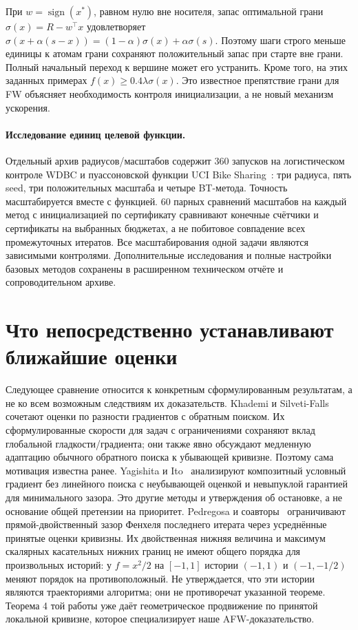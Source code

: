 При $w=\operatorname{sign}(x^*)$, равном нулю вне носителя,
запас оптимальной грани $\sigma(x)=R-w^\top x$ удовлетворяет
$\sigma(x+\alpha(s-x))=(1-\alpha)\sigma(x)+\alpha\sigma(s)$.
Поэтому шаги строго меньше единицы к атомам грани сохраняют
положительный запас при старте вне грани. Полный начальный переход
к вершине может его устранить. Кроме того, на этих заданных
примерах $f(x)\ge0.4\lambda\sigma(x)$.
Это известное препятствие грани для FW объясняет необходимость
контроля инициализации, а не новый механизм ускорения.

\paragraph{Исследование единиц целевой функции.}
Отдельный архив радиусов/масштабов содержит 360 запусков на
логистическом контроле WDBC и пуассоновской функции UCI Bike
Sharing~\cite{wdbc,bike}: три радиуса, пять seed, три положительных
масштаба и четыре BT-метода. Точность масштабируется вместе с функцией.
60 парных сравнений масштабов на каждый метод с инициализацией по
сертификату сравнивают конечные счётчики и сертификаты на выбранных
бюджетах, а не побитовое совпадение всех промежуточных итератов.
Все масштабирования одной задачи являются зависимыми контролями.
Дополнительные исследования и полные настройки базовых методов
сохранены в расширенном техническом отчёте и сопроводительном архиве.



\section{Что непосредственно устанавливают ближайшие оценки}
\label{app:comparison}
Следующее сравнение относится к конкретным сформулированным
результатам, а не ко всем возможным следствиям их доказательств.
Khademi и Silveti-Falls~\cite[теоремы 4.4--4.5]{khademi} сочетают
оценки по разности градиентов с обратным поиском. Их сформулированные
скорости для задач с ограничениями сохраняют вклад глобальной
гладкости/градиента; они также явно обсуждают медленную адаптацию
обычного обратного поиска к убывающей кривизне. Поэтому сама мотивация
известна ранее. Yagishita и Ito~\cite[алгоритм 3, теорема 3.1]{yagishita}
анализируют композитный условный градиент без линейного поиска с
неубывающей оценкой и невыпуклой гарантией для минимального зазора.
Это другие методы и утверждения об остановке, а не основание общей
претензии на приоритет. Pedregosa и соавторы~\cite[теорема 3]{pedregosa}
ограничивают прямой-двойственный зазор Фенхеля последнего итерата
через усреднённые принятые оценки кривизны. Их двойственная нижняя
величина и максимум скалярных касательных нижних границ не имеют
общего порядка для произвольных историй: у $f=x^2/2$ на $[-1,1]$
истории $(-1,1)$ и $(-1,-1/2)$ меняют порядок на противоположный.
Не утверждается, что эти истории являются траекториями алгоритма;
они не противоречат указанной теореме. Теорема 4 той работы уже
даёт геометрическое продвижение по принятой локальной кривизне,
которое специализирует наше AFW-доказательство.

